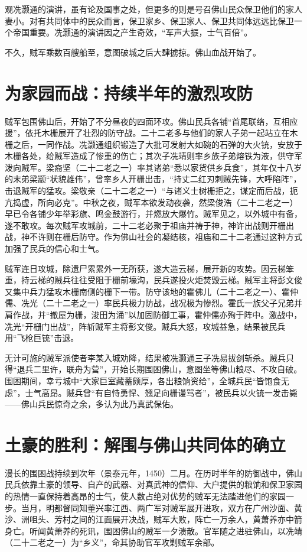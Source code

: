 观冼灏通的演讲，虽有论及国事之处，但更多的则是号召佛山民众保卫他们的家人妻小。对有共同体中的民众而言，保卫家乡、保卫家人、保卫共同体远远比保卫一个帝国重要。冼灏通的演讲因之产生奇效，“军声大振，士气百倍”。

不久，贼军乘数百艘船至，意图破城之后大肆掳掠。佛山血战开始了。

\section*{为家园而战：持续半年的激烈攻防}

贼军包围佛山后，开始了不分昼夜的四面环攻。佛山民兵各铺“首尾联络，互相应援”，依托木栅展开了壮烈的防守战。二十二老多与他们的家人子弟一起站立在木栅之后，一同作战。冼灏通组织锻造了大批可发射大如碗的石弹的大火铳，安放于木栅各处，给贼军造成了惨重的伤亡；其次子冼靖则率乡族子弟熔铁为液，供守军泼向贼军。梁裔坚（二十二老之一）率其诸弟“悉以家货供乡兵食”，其年仅十八岁的末弟梁颛“状貌雄伟”，曾率乡人开栅出击，“持丈二红刃刺贼先锋，大呼陷阵”，击退贼军的猛攻。梁敬亲（二十二老之一）“与诸义士树栅拒之，谋定而后战，扼亢捣虚，所向必克”。中秋之夜，贼军本欲发动夜袭，然梁俊浩（二十二老之一）早已令各铺少年举彩旗、鸣金鼓游行，并燃放大爆竹。贼军见之，以外城中有备，遂不敢攻。每次贼军攻城前，二十二老必聚于祖庙并祷于神，神许出战则开栅出战，神不许则在栅后防守。作为佛山社会的凝结核，祖庙和二十二老通过这种方式加强了民兵的信心和士气。

贼军连日攻城，除遗尸累累外一无所获，遂大造云梯，展开新的攻势。因云梯笨重，持云梯的贼兵往往受阻于栅前壕沟，民兵遂投火炬焚毁云梯。贼军主将彭文俊又集中兵力猛攻木栅南侧的栅下一带。防守该地的霍佛儿（二十二老之一）、霍仲儒、冼光（二十二老之一）率民兵极力防战，战况极为惨烈。霍氏一族父子兄弟并肩作战，并“撤屋为栅，浚田为涌”以加固防御工事，霍仲儒亦殉于阵中。激战中，冼光“开栅门出战”，阵斩贼军主将彭文俊。贼兵大怒，攻城益急，结果被民兵用“飞枪巨铳”击退。

无计可施的贼军派使者李某入城劝降，结果被冼灏通三子冼易拔剑斩杀。贼兵只得“退兵二里许，联舟为营”，开始长期围困佛山，意图坐等佛山粮尽、不攻自破。围困期间，幸亏城中“大家巨室藏蓄颇厚，各出粮饷资给”，全城兵民“皆饱食无虑”，士气高昂。贼兵曾“有自恃勇悍、翘足向栅谩骂者”，被民兵以火铳一发击毙——佛山兵民惊奇之余，多认为此乃真武保佑。

\section*{土豪的胜利：解围与佛山共同体的确立}

漫长的围困战持续到次年（景泰元年，1450）二月。在历时半年的防御战中，佛山民兵依靠土豪的领导、自产的武器、对真武神的信仰、大户提供的粮饷和保卫家园的热情一直保持着高昂的士气，使人数占绝对优势的贼军无法踏进他们的家园一步。当月，明都督同知董兴率江西、两广军对贼军展开进攻，双方在广州沙面、黄沙、洲咀头、芳村之间的江面展开决战，贼军大败，阵亡一万余人，黄萧养亦中箭身亡。听闻黄萧养的死讯，围困佛山的贼军一夕溃散。官军随之进驻佛山，以冼靖（二十二老之一）为“乡义”，命其协助官军攻剿贼军余部。


